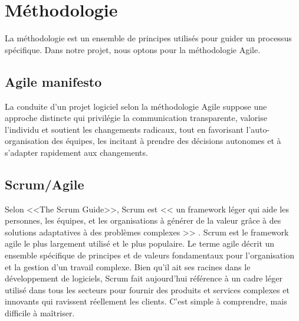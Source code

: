 \section{Méthodologie}
La méthodologie est un ensemble de principes utilisés pour guider un processus spécifique. Dans notre projet, nous optons pour la méthodologie Agile.
\subsection{Agile manifesto}
La conduite d'un projet logiciel selon la méthodologie Agile\cite*{beck2001agile} suppose une approche distincte qui privilégie la communication transparente, valorise l'individu et soutient les changements radicaux, tout en favorisant l'auto-organisation des équipes, les incitant à prendre des décisions autonomes et à s'adapter rapidement aux changements.\

\subsection{Scrum/Agile}
Selon <<The Scrum Guide\textsuperscript{\texttrademark}>>, Scrum est << un framework léger qui aide les personnes, les équipes, et les organisations à générer de la valeur grâce à des solutions adaptatives à des problèmes complexes >> \cite*{scrumalliance}. Scrum est le framework agile le plus largement utilisé et le plus populaire. Le terme agile décrit un ensemble spécifique de principes et de valeurs fondamentaux pour l'organisation et la gestion d'un travail complexe.
Bien qu'il ait ses racines dans le développement de logiciels, Scrum fait aujourd'hui référence à un cadre léger utilisé dans tous les secteurs pour fournir des produits et services complexes et innovants qui ravissent réellement les clients. C'est simple à comprendre, mais difficile à maîtriser.
